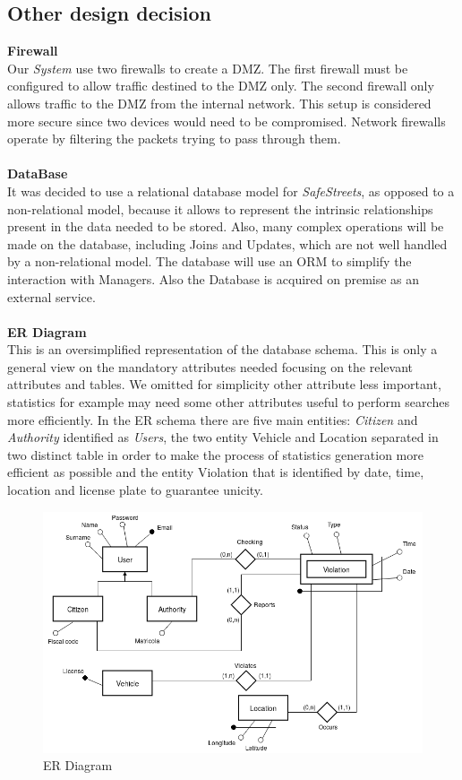 \documentclass{article}
\begin{document}
\clearpage

\subsection{Other design decision}
\textbf{Firewall}\\
Our \textit{System} use two firewalls to create a DMZ. The first 
firewall must be configured to allow traffic destined to the DMZ only. The second firewall only 
allows traffic to the DMZ from the internal network. This setup is considered more secure since two 
devices would need to be compromised. Network firewalls operate by filtering the packets trying to 
pass through them.
\\ 
\\
\textbf{DataBase}\\
It was decided to use a relational database model for \textit{SafeStreets}, as opposed to a 
non-relational model, because it allows to represent the intrinsic relationships present in 
the data needed to be stored. Also, many complex operations will be made on the database, 
including Joins and Updates, which are not well handled by a non-relational model. The database will use
an ORM to simplify the interaction with Managers. Also the Database is acquired on premise as 
an external service.
\\ 
\\
\textbf{ER Diagram}\\
This is an oversimplified representation of the database schema. This is only a general view 
on the mandatory attributes needed focusing on the relevant attributes and tables. We omitted 
for simplicity other attribute less important, statistics for example may need some other attributes 
useful to perform searches more efficiently. In the ER schema there are five main entities:  
\textit{Citizen} and \textit{Authority} identified as \textit{Users}, the two entity Vehicle and 
Location separated in two distinct table in order to make the process of statistics generation more 
efficient as possible and the entity Violation that is identified by date, time, location and license 
plate to guarantee unicity. 

\begin{figure}[H]
    \centering
    \includegraphics[scale=0.5]{img/ER_diagram.png}
    \caption{ER Diagram}
\end{figure}
\end{document}
